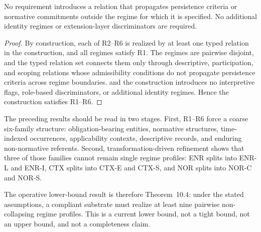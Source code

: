 No requirement introduces a relation that propagates
persistence criteria or normative commitments
outside the regime for which it is specified.
No additional identity regimes or extension-layer
discriminators are required.

\begin{proof}
By construction, each of R2--R6 is realized
by at least one typed relation
in the construction,
and all regimes satisfy R1.
The regimes are pairwise disjoint,
and the typed relation set connects them
only through descriptive, participation, and scoping relations
whose admissibility conditions
do not propagate persistence criteria across regime boundaries.
and the construction introduces no interpretive flags,
role-based discriminators, or additional identity regimes.
Hence the construction satisfies R1--R6.
\end{proof}


The preceding results should be read in two stages. First, R1--R6 force a
coarse six-family structure: obligation-bearing entities, normative structures,
time-indexed occurrences, applicability contexts, descriptive records, and
enduring non-normative referents. Second, transformation-driven refinement
shows that three of those families cannot remain single regime profiles:
ENR splits into ENR-L and ENR-I, CTX splits into CTX-E and CTX-S, and
NOR splits into NOR-C and NOR-S.

The operative lower-bound result is therefore Theorem~10.4: under the stated
assumptions, a compliant substrate must realize at least nine pairwise
non-collapsing regime profiles. This is a current lower bound, not a tight
bound, not an upper bound, and not a completeness claim.

